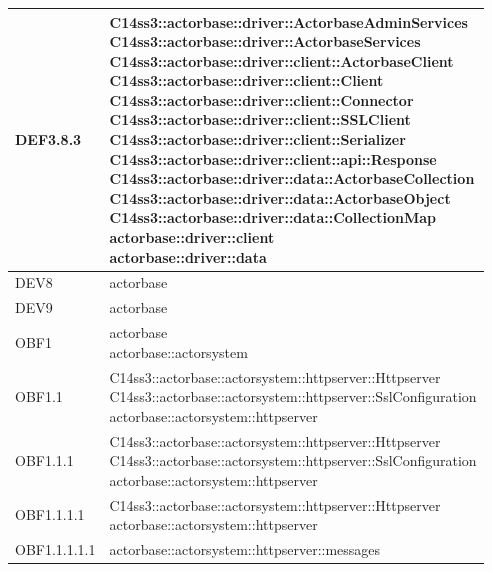 \documentclass{scalatekids-article}
\begin{document}
\begin{longtable}[H]{|p{4.5cm}|p{13cm}|}
DEF3.8.3 & \multiLineCell[t]{C14ss3::actorbase::driver::ActorbaseAdminServices\\C14ss3::actorbase::driver::ActorbaseServices\\C14ss3::actorbase::driver::client::ActorbaseClient\\C14ss3::actorbase::driver::client::Client\\C14ss3::actorbase::driver::client::Connector\\C14ss3::actorbase::driver::client::SSLClient\\C14ss3::actorbase::driver::client::Serializer\\C14ss3::actorbase::driver::client::api::Response\\C14ss3::actorbase::driver::data::ActorbaseCollection\\C14ss3::actorbase::driver::data::ActorbaseObject\\C14ss3::actorbase::driver::data::CollectionMap\\actorbase::driver::client\\actorbase::driver::data\\}\\
\hline
DEV8 & \multiLineCell[t]{actorbase\\}\\
\hline
DEV9 & \multiLineCell[t]{actorbase\\}\\
\hline
OBF1 & \multiLineCell[t]{actorbase\\actorbase::actorsystem\\}\\
\hline
OBF1.1 & \multiLineCell[t]{C14ss3::actorbase::actorsystem::httpserver::Httpserver\\C14ss3::actorbase::actorsystem::httpserver::SslConfiguration\\actorbase::actorsystem::httpserver\\}\\
\hline
OBF1.1.1 & \multiLineCell[t]{C14ss3::actorbase::actorsystem::httpserver::Httpserver\\C14ss3::actorbase::actorsystem::httpserver::SslConfiguration\\actorbase::actorsystem::httpserver\\}\\
\hline
OBF1.1.1.1 & \multiLineCell[t]{C14ss3::actorbase::actorsystem::httpserver::Httpserver\\actorbase::actorsystem::httpserver\\}\\
\hline
OBF1.1.1.1.1 & \multiLineCell[t]{actorbase::actorsystem::httpserver::messages\\}\\

\end{longtable}
\end{document}
